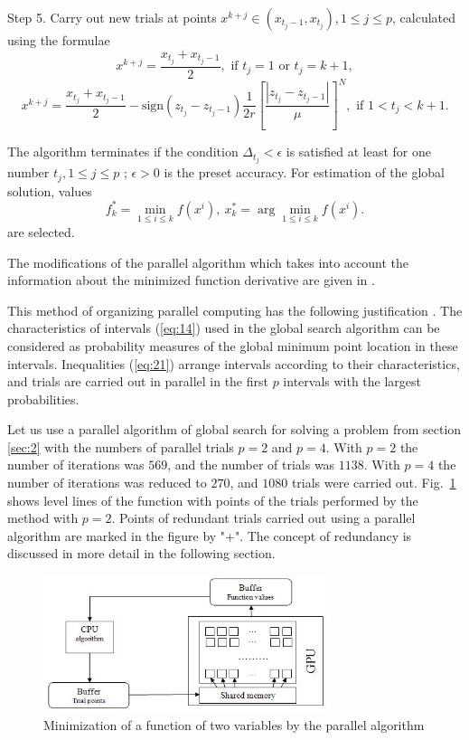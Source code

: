 \documentclass[smallcondensed]{svjour3}     %
\begin{document}
Step 5. Carry out new trials at points $x^{k+j}\in(x_{t_j-1},x_{t_j}), 1\leq j\leq p$, calculated using the formulae
\[
x^{k+j} = \frac{x_{t_j}+x_{t_j-1}}{2}, \textrm{ if } t_j=1 \textrm{ or } t_j=k+1,
\]
\[
x^{k+j} = \frac{x_{t_j}+x_{t_j-1}}{2} - \mathrm{sign}(z_{t_j}-z_{t_j-1})\frac{1}{2r}\left[\frac{\left|z_{t_j}-z_{t_j-1}\right|}{\mu}\right]^N, \textrm{ if } 1<t_j<k+1.
\]

The algorithm terminates if the condition $\Delta_{t_j}<\epsilon$ is satisfied at least for one number $t_j, 1 \leq j \leq p$ ; $\epsilon>0$ is the preset accuracy.  For estimation of the global solution, values
\[
f_k^\ast=\min_{1\leq i \leq k}f(x^i), \ x_k^\ast=\arg \min_{1\leq i \leq k}f(x^i).
\]
are selected.

The modifications of the parallel algorithm which takes into account the information about the minimized function derivative are given in \cite{RefGergel1999}.

This method of organizing parallel computing has the following justification \cite{RefStrongin2000,RefGrishagin1997}. The characteristics of intervals (\ref{eq:14}) used in the global search algorithm can be considered as probability measures of the global minimum point location in these intervals. Inequalities (\ref{eq:21}) arrange intervals according to their characteristics, and trials are carried out in parallel in the first $p$ intervals with the largest probabilities.

Let us use a parallel algorithm of global search for solving a problem from section \ref{sec:2} with the numbers of parallel trials $p=2$ and $p=4$. With $p=2$ the number of iterations was $569$, and the number of trials was $1138$. With $p=4$ the number of iterations was reduced to $270$, and $1080$ trials were carried out. Fig.~\ref{fig:2} shows level lines of the function with points of the trials performed by the method with $p=2$. Points of redundant trials carried out using a parallel algorithm are marked in the figure by "+". The concept of redundancy is discussed in more detail in the following section.
\begin{figure}
	\center
  \includegraphics[width=0.75\textwidth]{fig3.jpg} 
  \caption{Minimization of a function of two variables by the parallel algorithm}
  \label{fig:2}
\end{figure}
\end{document}
